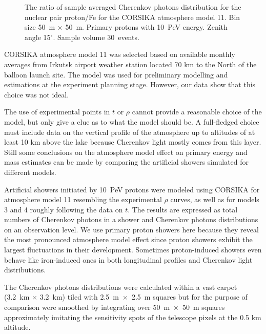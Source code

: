 \documentclass[universe,article,submit,moreauthors,pdftex]{Definitions/mdpi}
\begin{document}
\begin{paracol}{2}
\begin{figure}[tb]
\begin{minipage}[t]{0.48\textwidth}
        \vspace{-1.0pc}
        \caption{The ratio of sample averaged Cherenkov photons distribution for the nuclear pair proton/Fe for the CORSIKA atmosphere model 11. Bin size 50~m $\times$ 50~m. Primary protons with 10~PeV energy. Zenith angle 15$^\circ$. Sample volume 30~events.}
        \label{fig:pdFe}
    \end{minipage}
\end{figure}


CORSIKA atmosphere model 11 was selected based on available monthly averages from Irkutsk airport weather station located 70 km to the North of the balloon launch site. The model was used for preliminary modelling and estimations at the experiment planning stage. However, our data show that this choice was not ideal.

The use of experimental points in $t$ or $\rho$ cannot provide a reasonable choice of the model, but only give a clue as to what the model should be. A full-fledged choice must include data on the vertical profile of the atmosphere up to altitudes of at least 10 km above the lake because Cherenkov light mostly comes from this layer. Still some conclusions on the atmosphere model effect on primary energy and mass estimates can be made by comparing the artificial showers simulated for different models.

Artificial showers initiated by 10~PeV protons were modeled using CORSIKA for atmosphere model 11 resembling the experimental $\rho$ curves, as well as for models 3 and 4 roughly following the data on $t$. The results are expressed as total numbers of Cherenkov photons in a shower and Cherenkov photons distributions on an observation level. We use primary proton showers here because they reveal the most pronounced atmosphere model effect since proton showers exhibit the largest fluctuations in their development. Sometimes proton-induced showers even behave like iron-induced ones in both longitudinal profiles and  Cherenkov light distributions. 

The Cherenkov photons distributions were calculated within a vast carpet (3.2~km $\times$ 3.2~km) tiled with 2.5~m~$\times$~2.5~m squares but for the purpose of comparison were smoothed by integrating over 50~m~$\times$~50~m squares approximately imitating the sensitivity spots of the telescope pixels at the 0.5 km altitude.


\end{paracol}
\end{document}
